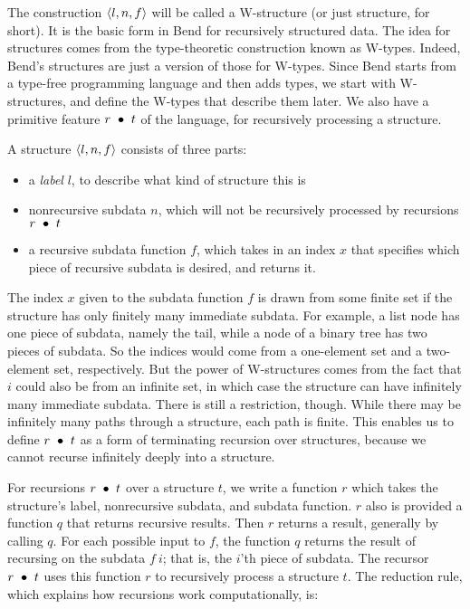 \documentclass{article}
\begin{document}
The construction $\langle l , n, f \rangle$ will be called a W-structure (or just structure, for short).
It is the basic form in Bend for recursively structured data.  The idea for structures
comes from the type-theoretic construction known as W-types.  Indeed, Bend's structures
are just a version of those for W-types.  Since Bend starts from a type-free programming
language and then adds types, we start with W-structures, and define the W-types that
describe them later.  We also have a primitive feature $r\ \bullet\ t$ of the language,
for recursively processing a structure.

A structure $\langle l , n, f \rangle$ consists of three parts:
\begin{itemize}
\item a \emph{label} $l$, to describe what kind of structure this is
\item nonrecursive subdata $n$, which will not be recursively processed
  by recursions $r\ \bullet\ t$
\item a recursive subdata function $f$, which takes in an index $x$
  that specifies which piece of recursive subdata is desired, and
  returns it.
  \end{itemize}

\noindent The index $x$ given to the subdata function $f$ is drawn
from some finite set if the structure has only finitely many immediate
subdata.  For example, a list node has one piece of subdata, namely
the tail, while a node of a binary tree has two pieces of subdata.  So
the indices would come from a one-element set and a two-element set,
respectively.  But the power of W-structures comes from the fact that
$i$ could also be from an infinite set, in which case the structure
can have infinitely many immediate subdata.  There is still a
restriction, though.  While there may be infinitely many paths through
a structure, each path is finite.  This enables us to define
$r\ \bullet\ t$ as a form of terminating recursion over structures,
because we cannot recurse infinitely deeply into a structure.

For recursions $r\ \bullet\ t$ over a structure $t$, we write a function
$r$ which takes the structure's label, nonrecursive subdata, and
subdata function.  $r$ also is provided a function $q$ that returns
recursive results.  Then $r$  returns a result, generally by calling
$q$.  For each possible input to $f$, the function $q$ returns the
result of recursing on the subdata $f\ i$; that is, the $i$'th piece
of subdata.  The recursor $r\ \bullet\ t$ uses this function $r$ to
recursively process a structure $t$. The reduction rule, which
explains how recursions work computationally, is:
\end{document}

